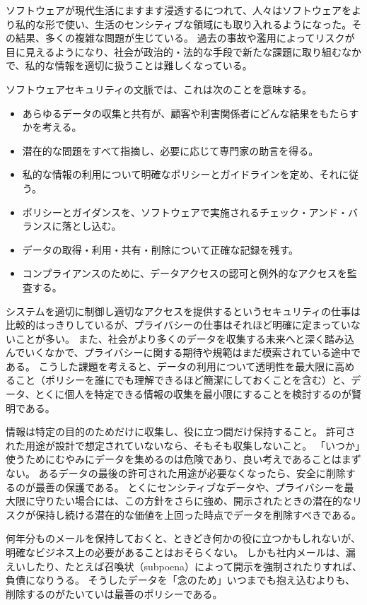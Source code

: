 \documentclass[uplatex]{jsarticle}
\def\label#1{}%
\begin{document}
ソフトウェアが現代生活にますます浸透するにつれて、人々はソフトウェアをより私的な形で使い、生活のセンシティブな領域にも取り入れるようになった。その結果、多くの複雑な問題が生じている。
過去の事故や濫用によってリスクが目に見えるようになり、社会が政治的・法的な手段で新たな課題に取り組むなかで、私的な情報を適切に扱うことは難しくなっている。

ソフトウェアセキュリティの文脈では、これは次のことを意味する。
\begin{itemize}
\item あらゆるデータの収集と共有が、顧客や利害関係者にどんな結果をもたらすかを考える。
\item 潜在的な問題をすべて指摘し、必要に応じて専門家の助言を得る。
\item 私的な情報の利用について明確なポリシーとガイドラインを定め、それに従う。
\item ポリシーとガイダンスを、ソフトウェアで実施されるチェック・アンド・バランスに落とし込む。
\item データの取得・利用・共有・削除について正確な記録を残す。
\item コンプライアンスのために、データアクセスの認可と例外的なアクセスを監査する。
\end{itemize}

システムを適切に制御し適切なアクセスを提供するというセキュリティの仕事は比較的はっきりしているが、プライバシーの仕事はそれほど明確に定まっていないことが多い。
また、社会がより多くのデータを収集する未来へと深く踏み込んでいくなかで、プライバシーに関する期待や規範はまだ模索されている途中である。
こうした課題を考えると、データの利用について透明性を最大限に高めること（ポリシーを誰にでも理解できるほど簡潔にしておくことを含む）と、データ、とくに個人を特定できる情報の収集を最小限にすることを検討するのが賢明である。

情報は特定の目的のためだけに収集し、役に立つ間だけ保持すること。
許可された用途が設計で想定されていないなら、そもそも収集しないこと。
「いつか」使うためにむやみにデータを集めるのは危険であり、良い考えであることはまずない。
あるデータの最後の許可された用途が必要なくなったら、安全に削除するのが最善の保護である。
とくにセンシティブなデータや、プライバシーを最大限に守りたい場合には、この方針をさらに強め、開示されたときの潜在的なリスクが保持し続ける潜在的な価値を上回った時点でデータを削除すべきである。

\begin{exa}[長年分のメールの保持]\label{exa:ch1-email-retention}
何年分ものメールを保持しておくと、ときどき何かの役に立つかもしれないが、明確なビジネス上の必要があることはおそらくない。
しかも社内メールは、漏えいしたり、たとえば召喚状（subpoena）によって開示を強制されたりすれば、負債になりうる。
そうしたデータを「念のため」いつまでも抱え込むよりも、削除するのがたいていは最善のポリシーである。
\end{exa}
\end{document}
